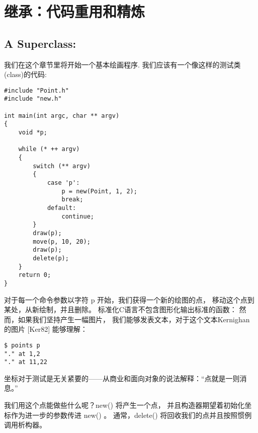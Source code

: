 

\chapter{继承：代码重用和精炼}
\label{ch:Inheritance}

\section{A Superclass:}

我们在这个章节里将开始一个基本绘画程序.
我们应该有一个像这样的测试类(class)的代码:

\begin{lstlisting}
#include "Point.h"
#include "new.h"

int main(int argc, char ** argv)
{
    void *p;
    
    while (* ++ argv)
    {
        switch (** argv)
        {
            case 'p':
                p = new(Point, 1, 2);
                break;
            default:
                continue;
        }
        draw(p);
        move(p, 10, 20);
        draw(p);
        delete(p);
    }
    return 0;
}
\end{lstlisting}


对于每一个命令参数以字符 p 开始，我们获得一个新的绘图的点，
移动这个点到某处，从新绘制，并且删除。
标准化C语言不包含图形化输出标准的函数：
然而，如果我们坚持产生一幅图片，
我们能够发表文本，对于这个文本Kernighan 的图片 [Ker82] 能够理解：

\begin{lstlisting}
$ points p
"." at 1,2
"." at 11,22
\end{lstlisting}

坐标对于测试是无关紧要的——从商业和面向对象的说法解释：“点就是一则消息。”


我们用这个点能做些什么呢？new() 将产生一个点，
并且构造器期望着初始化坐标作为进一步的参数传进 new() 。
通常，delete() 将回收我们的点并且按照惯例调用析构器。


